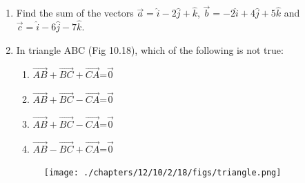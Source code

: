 \begin{enumerate}[label=\thesection.\arabic*,ref=\thesection.\theenumi]
\item Find the sum of the vectors $\vec{a}=\hat{i}-2\hat{j}+\hat{k}$, $\vec{b}=-2\hat{i}+4\hat{j}+5\hat{k}$ and $\vec{c}=\hat{i}-6\hat{j}-7\hat{k}$.
\item 

	In triangle ABC (Fig 10.18), which of the following is not true:
 \begin{enumerate}
         \item $\overrightarrow{AB}+\overrightarrow{BC}+\overrightarrow{CA}$=$\vec{0}$
         \item $\overrightarrow{AB}+\overrightarrow{BC}-\overrightarrow{CA}$=$\vec{0}$
         \item $\overrightarrow{AB}+\overrightarrow{BC}-\overrightarrow{CA}$=$\vec{0}$
         \item $\overrightarrow{AB}-\overrightarrow{BC}+\overrightarrow{CA}$=$\vec{0}$
\end{enumerate}
\begin{figure}[h]
\centering
\texttt{[image: ./chapters/12/10/2/18/figs/triangle.png]}
\caption{}
	\label{fig:chapters/12/10/2/18/}
\end{figure}
\solution
		


\end{enumerate}
